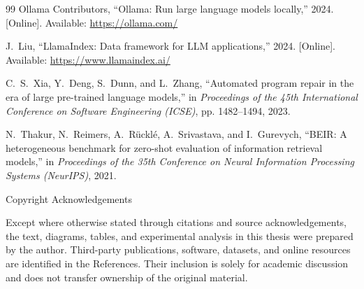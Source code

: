 \documentclass[12pt,letterpaper,oneside]{report}
\newenvironment{physicalcenter}{%
    \par\noindent\hspace*{-18pt}\begin{minipage}[t]{\textwidth}\centering
}{%
    \end{minipage}\par
}
\newcommand{\frontmatterheading}[1]{%
    \begin{physicalcenter}
        {\sffamily\fontsize{16}{19.2}\selectfont #1\par}
    \end{physicalcenter}
    \vspace{12pt}
}
\begin{document}
\begin{singlespace}
\begin{thebibliography}{99}
Ollama Contributors, ``Ollama: Run large language models locally,'' 2024. [Online]. Available: \url{https://ollama.com/}

J.~Liu, ``LlamaIndex: Data framework for LLM applications,'' 2024. [Online]. Available: \url{https://www.llamaindex.ai/}

C.~S.~Xia, Y.~Deng, S.~Dunn, and L.~Zhang, ``Automated program repair in the era of large pre-trained language models,'' in \textit{Proceedings of the 45th International Conference on Software Engineering (ICSE)}, pp. 1482--1494, 2023.

N.~Thakur, N.~Reimers, A.~R{\"u}ckl{\'e}, A.~Srivastava, and I.~Gurevych, ``BEIR: A heterogeneous benchmark for zero-shot evaluation of information retrieval models,'' in \textit{Proceedings of the 35th Conference on Neural Information Processing Systems (NeurIPS)}, 2021.

\end{thebibliography}
\end{singlespace}
\fussy

\clearpage
{}
\frontmatterheading{Copyright Acknowledgements}
Except where otherwise stated through citations and source acknowledgements, the text, diagrams, tables, and experimental analysis in this thesis were prepared by the author. Third-party publications, software, datasets, and online resources are identified in the References. Their inclusion is solely for academic discussion and does not transfer ownership of the original material.
\end{document}
